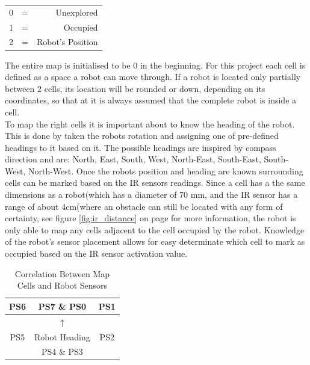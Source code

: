 \begin{table}[h]
\begin{center}
\begin{tabular}{l c r}
0 & = & Unexplored \\
1 & = & Occupied \\
2 & = & Robot's Position \\
\end{tabular}
\end{center}
\end{table}

The entire map is initialised to be 0 in the beginning. For this project each cell is defined as a space a robot can move through. 
If a robot is located only partially between 2 cells, its location will be rounded or down, depending on its coordinates, so that at it is always assumed that the complete robot is inside a cell.\\

To map the right cells it is important about to know the heading of the robot. This is done by taken the robots rotation and assigning one of pre-defined headings to it based on it. 
The possible headings are inspired by compass direction and are: North, East, South, West, North-East, South-East, South-West, North-West.
Once the robots position and heading are known surrounding cells can be marked based on the IR sensors readings. Since a cell has a the same dimensions as a robot(which has a diameter of 70 mm, and the IR sensor has a range of about 4cm(where an obstacle can still be located with any form of certainty, see figure \ref{fig:ir_distance} on page \pageref{fig:ir_distance} for more information, the robot is only able to map any cells adjacent to the cell occupied by the robot. 
Knowledge of the robot's sensor placement allows for easy determinate which cell to mark as occupied based on the IR sensor activation value. \\

\begin{table}[h]
\begin{center}
\begin{tabular}{c | c | c}
PS6 & PS7 \& PS0 & PS1 \\\hline
 & $\uparrow$ & \\
PS5 & Robot Heading & PS2 \\\hline
 & PS4 \& PS3 & 
\end{tabular}
\caption{Correlation Between Map Cells and Robot Sensors}
\label{tab:cells}
\end{center}
\end{table}

